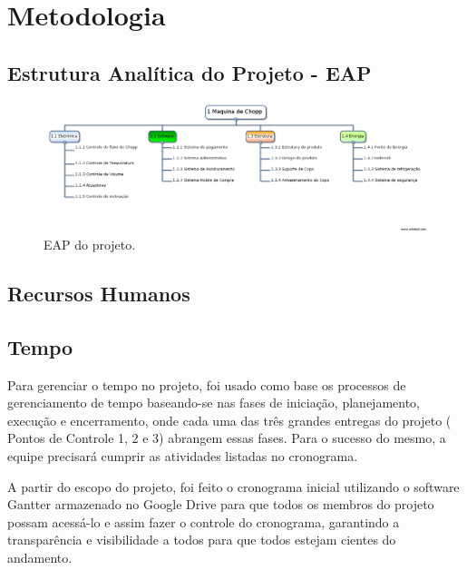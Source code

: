 \chapter[Metodologia]{Metodologia}

	\section[Estrutura Analítica do Projeto - EAP]{Estrutura Analítica do Projeto - EAP}

	\begin{figure}[H]
		\centering
		\includegraphics[scale= 0.4]{figuras/eap.png}
		\caption{EAP do projeto.}
		\label{eap}
	\end{figure}

	\section[Recursos Humanos]{Recursos Humanos}
	
	\section[Tempo]{Tempo}
		Para gerenciar o tempo no projeto, foi usado como base os processos de gerenciamento de tempo baseando-se nas 
		fases de iniciação, planejamento, execução e encerramento, onde cada uma das três grandes entregas do projeto (
		Pontos de Controle 1, 2 e 3) abrangem essas fases. Para o sucesso do mesmo, a equipe precisará cumprir as 
		atividades listadas no cronograma.

		A partir do escopo do projeto, foi feito o cronograma inicial utilizando o software Gantter armazenado no 
		Google Drive para que todos os membros do projeto possam acessá-lo e assim fazer o controle do cronograma, 
		garantindo a transparência e visibilidade a todos para que todos estejam cientes do andamento.

